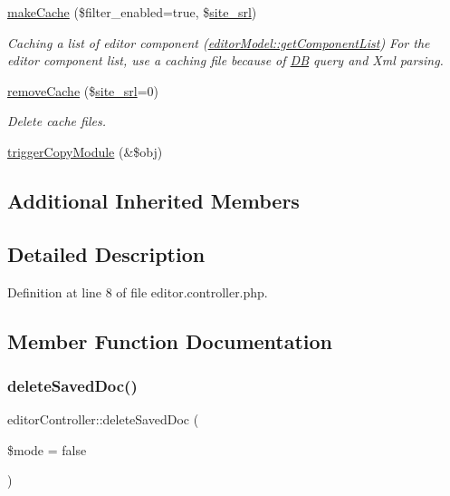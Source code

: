 \begin{DoxyCompactItemize}
\hyperlink{classeditorController_a246bf423c2f25208758a5cbcd2ba9890}{make\+Cache} (\$filter\+\_\+enabled=true, \$\hyperlink{ko_8install_8php_a8b1406b4ad1048041558dce6bfe89004}{site\+\_\+srl})
\begin{DoxyCompactList}\small\item\em Caching a list of editor component (\hyperlink{classeditorModel_a24cf5d2f9bc9783dd2efd85fb0f89408}{editor\+Model\+::get\+Component\+List}) For the editor component list, use a caching file because of \hyperlink{classDB}{DB} query and Xml parsing. \end{DoxyCompactList}\item 
\hyperlink{classeditorController_a0a512fff61d647692ad254eacafb8f0b}{remove\+Cache} (\$\hyperlink{ko_8install_8php_a8b1406b4ad1048041558dce6bfe89004}{site\+\_\+srl}=0)
\begin{DoxyCompactList}\small\item\em Delete cache files. \end{DoxyCompactList}\item 
\hyperlink{classeditorController_acccfd1dab6c8c48a2eb232ae2e46e6bf}{trigger\+Copy\+Module} (\&\$obj)
\end{DoxyCompactItemize}
\subsection*{Additional Inherited Members}


\subsection{Detailed Description}


Definition at line 8 of file editor.\+controller.\+php.



\subsection{Member Function Documentation}
\mbox{\label{classeditorController_abfe95017a9b2baa548dde4a339af5df4}} 
\subsubsection{\texorpdfstring{delete\+Saved\+Doc()}{deleteSavedDoc()}}
{\footnotesize\ttfamily editor\+Controller\+::delete\+Saved\+Doc (\begin{DoxyParamCaption}\item[{}]{\$mode = {\ttfamily false} }\end{DoxyParamCaption})}



